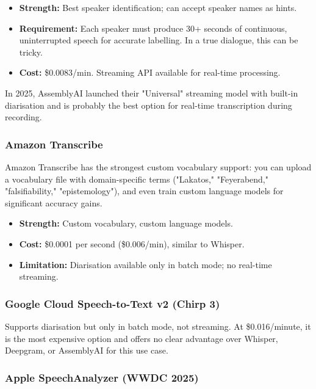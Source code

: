 \documentclass[11pt,letterpaper]{article}
\begin{document}
\begin{itemize}
  \item \textbf{Strength:} Best speaker identification; can accept speaker names as hints.
  \item \textbf{Requirement:} Each speaker must produce 30+ seconds of continuous, uninterrupted speech for accurate labelling. In a true dialogue, this can be tricky.
  \item \textbf{Cost:} \$0.0083/min. Streaming API available for real-time processing.
\end{itemize}

In 2025, AssemblyAI launched their "Universal" streaming model with built-in diarisation and is probably the best option for real-time transcription during recording.

\subsubsection{Amazon Transcribe}

Amazon Transcribe has the strongest custom vocabulary support: you can upload a vocabulary file with domain-specific terms ("Lakatos," "Feyerabend," "falsifiability," "epistemology"), and even train custom language models for significant accuracy gains.

\begin{itemize}
  \item \textbf{Strength:} Custom vocabulary, custom language models.
  \item \textbf{Cost:} \$0.0001 per second (\$0.006/min), similar to Whisper.
  \item \textbf{Limitation:} Diarisation available only in batch mode; no real-time streaming.
\end{itemize}

\subsubsection{Google Cloud Speech-to-Text v2 (Chirp 3)}

Supports diarisation but only in batch mode, not streaming. At \$0.016/minute, it is the most expensive option and offers no clear advantage over Whisper, Deepgram, or AssemblyAI for this use case.

\subsubsection{Apple SpeechAnalyzer (WWDC 2025)}
\end{document}
